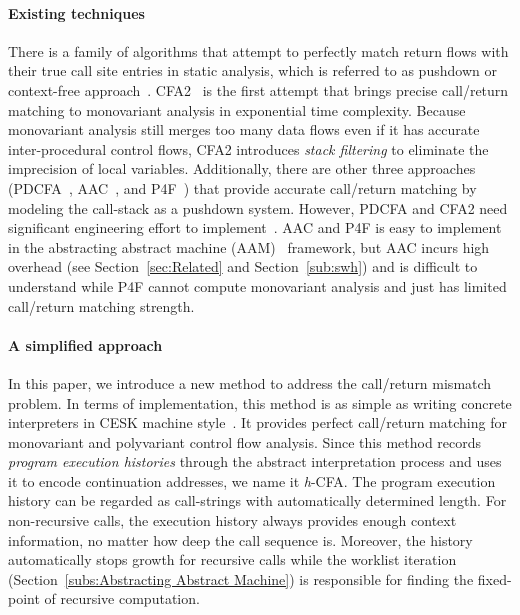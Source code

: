 \documentclass[12pt]{report}
\begin{document}
\paragraph{Existing techniques}
There is a family of algorithms that attempt to perfectly match return flows with their true call site entries in static analysis, which is referred to as pushdown or context-free approach~\cite{reps1995precise, sagiv1996precise}.
CFA2~\cite{vardoulakis2010cfa2} is the first attempt that brings precise call/return matching to monovariant analysis in exponential time complexity.
Because monovariant analysis still merges too many data flows even if it has accurate inter-procedural control flows, CFA2 introduces \emph{stack filtering} to eliminate the imprecision of local variables.
Additionally, there are other three approaches (PDCFA~\cite{earl2010pushdown}, AAC~\cite{johnson2015abstracting}, and P4F~\cite{gilray2016pushdown}) that provide accurate call/return matching by modeling the call-stack as a pushdown system.
However, PDCFA and CFA2 need significant engineering effort to implement~\cite{gilray2016pushdown}.
AAC and P4F is easy to implement in the abstracting abstract machine (AAM)~\cite{van2010abstracting} framework, but AAC incurs high overhead (see Section~\ref{sec:Related} and Section~\ref{sub:swh}) and is difficult to understand while P4F cannot compute monovariant analysis and just has limited call/return matching strength.

\paragraph{A simplified approach}
In this paper, we introduce a new method to address the call/return mismatch problem.
In terms of implementation, this method is as simple as writing concrete interpreters in CESK machine style~\cite{felleisen1987calculus}.
It provides perfect call/return matching for monovariant and polyvariant control flow analysis.
Since this method records \emph{program execution histories} through the abstract interpretation process and uses it to encode continuation addresses, we name it \textit{h}-CFA\@.
The program execution history can be regarded as call-strings with automatically determined length.
For non-recursive calls, the execution history always provides enough context information, no matter how deep the call sequence is.
Moreover, the history automatically stops growth for recursive calls while the worklist iteration (Section~\ref{subs:Abstracting Abstract Machine}) is responsible for finding the fixed-point of recursive computation.
\end{document}
